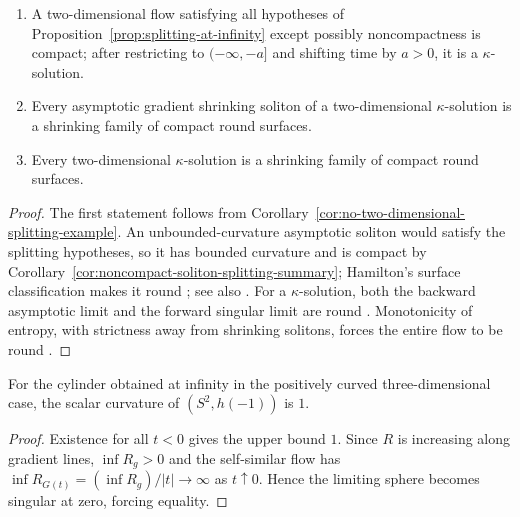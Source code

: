 \begin{corollary}\label{cor:two-dimensional-gradient-shrinking-soliton}
\label{2DGSS}

\begin{enumerate}
\item[(1)] A two-dimensional flow satisfying all hypotheses of
Proposition~\ref{prop:splitting-at-infinity} except possibly
noncompactness is compact; after restricting to $(-\infty,-a]$ and
shifting time by $a>0$, it is a $\kappa$-solution.
\item[(2)] Every asymptotic gradient shrinking soliton of a
two-dimensional $\kappa$-solution is a shrinking family of compact
round surfaces.
\item[(3)] Every two-dimensional $\kappa$-solution is a shrinking
family of compact round surfaces.
\end{enumerate}
\end{corollary}
\begin{proof}
\sketch
{}
The first statement follows from
Corollary~\ref{cor:no-two-dimensional-splitting-example}. An
unbounded-curvature asymptotic soliton would satisfy the splitting
hypotheses, so it has bounded curvature and is compact by
Corollary~\ref{cor:noncompact-soliton-splitting-summary}; Hamilton's
surface classification makes it round \cite{Hamiltonsurface}; see
also \cite{ChowKnopf}. For a $\kappa$-solution, both the backward
asymptotic limit and the forward singular limit are round
\cite{ChowKnopf}. Monotonicity of entropy, with
strictness away from shrinking solitons, forces the entire flow to
be round \cite{ChowKnopf}.
\end{proof}

\begin{claim}\label{claim:cylinder-limit-scalar-curvature-normalization}
For the cylinder obtained at infinity in the positively curved
three-dimensional case, the scalar curvature of $(S^2,h(-1))$ is
$1$.
\end{claim}
\begin{proof}
\sketch Existence for all $t<0$ gives the upper bound $1$. Since
$R$ is increasing along gradient lines, $\inf R_g>0$ and the
self-similar flow has $\inf R_{G(t)}=(\inf R_g)/|t|\to\infty$ as
$t\uparrow0$. Hence the limiting sphere becomes singular at zero,
forcing equality.
\end{proof}

